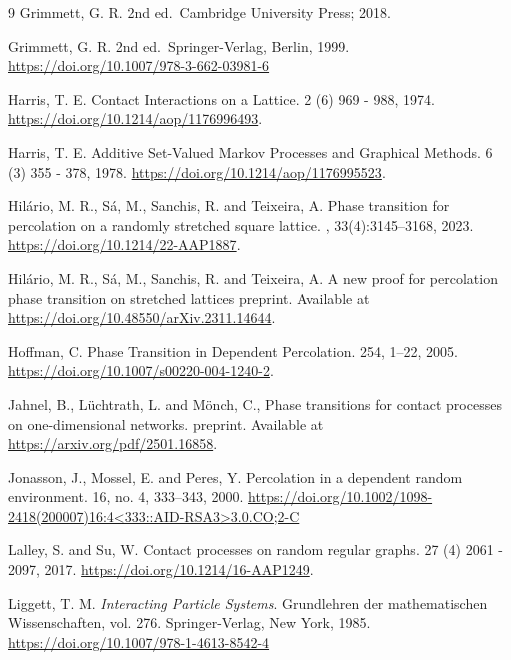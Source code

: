 \documentclass[a4paper,oneside,12pt]{amsart}
\theoremstyle{plain}
\theoremstyle{definition}
\theoremstyle{remark}
\begin{document}
\begin{thebibliography}{9}
 Grimmett, G. R.
  2nd ed.\ Cambridge University Press; 2018.

{Grimmett, G. R.}  
 2nd ed.\ Springer-Verlag, Berlin, 1999.
\newblock \url{https://doi.org/10.1007/978-3-662-03981-6}

Harris, T. E. 
\newblock Contact Interactions on a Lattice.
 2 (6) 969 - 988,  1974. \newblock \url{https://doi.org/10.1214/aop/1176996493}.

Harris, T. E. 
\newblock Additive Set-Valued Markov Processes and Graphical Methods.
 6 (3) 355 - 378, 1978.
\newblock \url{https://doi.org/10.1214/aop/1176995523}.

Hil\'ario, M. R.,  S\'a, M., Sanchis, R. and Teixeira, A.
\newblock Phase transition for percolation on a randomly stretched square lattice.
, 33(4):3145--3168, 2023.
\newblock \url{https://doi.org/10.1214/22-AAP1887}.

Hil\'ario, M. R.,  S\'a, M., Sanchis, R. and Teixeira, A.
A new proof for percolation phase transition on stretched lattices
\newblock preprint.
\newblock Available at \url{https://doi.org/10.48550/arXiv.2311.14644}.

Hoffman, C.
\newblock Phase Transition in Dependent Percolation. 
 254, 1–22, 2005. 
\newblock \url{https://doi.org/10.1007/s00220-004-1240-2}.

Jahnel, B., Lüchtrath, L. and  Mönch, C.,
\newblock Phase transitions for contact processes on one-dimensional networks.
\newblock preprint.
\newblock Available at \url{https://arxiv.org/pdf/2501.16858}.

  Jonasson, J., Mossel, E. and  Peres, Y.
\newblock Percolation in a dependent random environment. 
 16,  no. 4, 333–343, 2000.
\newblock \url{ https://doi.org/10.1002/1098-2418(200007)16:4<333::AID-RSA3>3.0.CO;2-C}

Lalley, S. and  Su, W.
\newblock Contact processes on random regular graphs.
 27 (4) 2061 - 2097,  2017. 
\newblock \url{https://doi.org/10.1214/16-AAP1249}.

Liggett, T. M.
\newblock \emph{Interacting Particle Systems}. Grundlehren der mathematischen Wissenschaften, vol. 276. Springer-Verlag, New York, 1985. 
\newblock \url{https://doi.org/10.1007/978-1-4613-8542-4}


\end{thebibliography}
\end{document}
